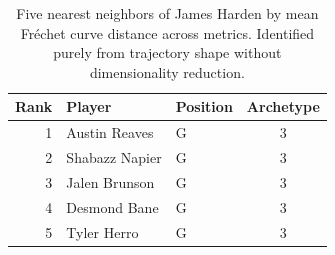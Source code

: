 \begin{table}[htbp]
  \centering\small
  \begin{tabular}{rllc}
    \toprule
    Rank & Player & Position & Archetype \\
    \midrule
    1 & Austin Reaves & G & 3 \\
    2 & Shabazz Napier & G & 3 \\
    3 & Jalen Brunson & G & 3 \\
    4 & Desmond Bane & G & 3 \\
    5 & Tyler Herro & G & 3 \\
    \bottomrule
  \end{tabular}
  \caption{Five nearest neighbors of James Harden by mean Fr\'{e}chet curve distance across metrics. Identified purely from trajectory shape without dimensionality reduction.}
  \label{tab:James_Harden_frechet_curve_neighbors}
\end{table}

